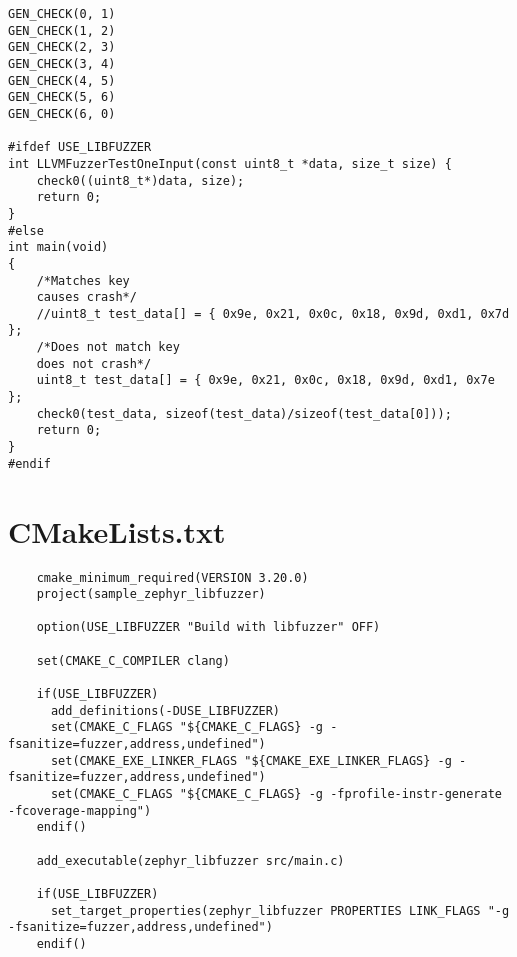 \begin{verbatim}
GEN_CHECK(0, 1)
GEN_CHECK(1, 2)
GEN_CHECK(2, 3)
GEN_CHECK(3, 4)
GEN_CHECK(4, 5)
GEN_CHECK(5, 6)
GEN_CHECK(6, 0)

#ifdef USE_LIBFUZZER
int LLVMFuzzerTestOneInput(const uint8_t *data, size_t size) {
    check0((uint8_t*)data, size);
    return 0;
}
#else
int main(void)
{
    /*Matches key
    causes crash*/
    //uint8_t test_data[] = { 0x9e, 0x21, 0x0c, 0x18, 0x9d, 0xd1, 0x7d };
    /*Does not match key
    does not crash*/
    uint8_t test_data[] = { 0x9e, 0x21, 0x0c, 0x18, 0x9d, 0xd1, 0x7e };
    check0(test_data, sizeof(test_data)/sizeof(test_data[0]));
    return 0;
}
#endif

\end{verbatim}

\section*{CMakeLists.txt}
\begin{verbatim}
    cmake_minimum_required(VERSION 3.20.0)
    project(sample_zephyr_libfuzzer)

    option(USE_LIBFUZZER "Build with libfuzzer" OFF)

    set(CMAKE_C_COMPILER clang)

    if(USE_LIBFUZZER)
      add_definitions(-DUSE_LIBFUZZER)
      set(CMAKE_C_FLAGS "${CMAKE_C_FLAGS} -g -fsanitize=fuzzer,address,undefined")
      set(CMAKE_EXE_LINKER_FLAGS "${CMAKE_EXE_LINKER_FLAGS} -g -fsanitize=fuzzer,address,undefined")
      set(CMAKE_C_FLAGS "${CMAKE_C_FLAGS} -g -fprofile-instr-generate -fcoverage-mapping")
    endif()

    add_executable(zephyr_libfuzzer src/main.c)

    if(USE_LIBFUZZER)
      set_target_properties(zephyr_libfuzzer PROPERTIES LINK_FLAGS "-g -fsanitize=fuzzer,address,undefined")
    endif()

\end{verbatim}
\clearpage